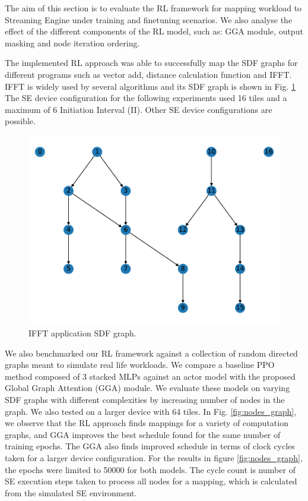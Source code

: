 
The aim of this section is to evaluate the RL framework for mapping workload to Streaming Engine under training and finetuning scenarios. 
We also analyse the effect of the different components of the RL model, such as: GGA module, output masking and node iteration ordering.

The implemented RL approach was able to successfully map the SDF graphs for different programs such as vector add, distance calculation function and IFFT. 
IFFT is widely used by several algorithms and its SDF graph is shown in Fig. \ref{fig:ifft_graph} 
The SE device configuration for the following experiments used 16 tiles and a maximum of 6 Initiation Interval (II).
Other SE device configurations are possible.

\begin{figure}[h]
  \centering
  \includegraphics[width=\linewidth]{fig/ifft_graph.pdf}
  \caption{IFFT application SDF graph.}
  \label{fig:ifft_graph}
\end{figure}


We also benchmarked our RL framework against a collection of random directed graphs meant to simulate real life workloads. 
We compare a baseline PPO method composed of 3 stacked MLPs against an actor model with the proposed Global Graph Attention (GGA) module.
We evaluate these models on varying SDF graphs with different complexities by increasing number of nodes in the graph. 
We also tested on a larger device with 64 tiles.
In Fig. \ref{fig:nodes_graph}, we observe that the RL approach finds mappings for a variety of computation graphs, and GGA
improves the best schedule found for the same number of training epochs. The GGA also finds improved schedule in terms of clock cycles taken for a larger device configuration. 
For the results in figure \ref{fig:nodes_graph}, the epochs were limited to 50000 for both models. 
The cycle count is number of SE execution steps taken to process all nodes for a mapping, which is calculated from the simulated SE environment. 

